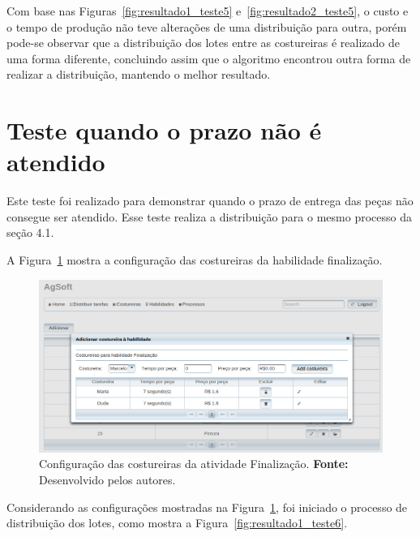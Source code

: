 \par Com base nas Figuras~\ref{fig:resultado1_teste5}
e~\ref{fig:resultado2_teste5}, o custo e o tempo de produção não teve alterações de uma distribuição para outra, porém 
pode-se observar que a distribuição dos lotes entre as costureiras é realizado de uma forma
diferente, concluindo assim que o algoritmo encontrou outra forma de realizar a
distribuição, mantendo o melhor resultado.

\section{Teste quando o prazo não é atendido}

\par Este teste foi realizado para demonstrar quando o prazo de entrega das
peças não consegue ser atendido. Esse teste realiza a distribuição para o mesmo
processo da seção 4.1.

\par A Figura~\ref{fig:configuracao_costureiras_teste6} mostra a configuração
das costureiras da habilidade finalização.

\begin{figure}[h!]
	\centerline{\includegraphics[width=13.5cm]{./imagens/configuracao_costureiras_teste6.png}}
	\caption[Configuração das costureiras da atividade Finalização.] 
	{Configuração das costureiras da atividade Finalização. \textbf{Fonte:} Desenvolvido pelos
	autores.}
	\label{fig:configuracao_costureiras_teste6}
\end{figure}

\par Considerando as configurações mostradas na
Figura~\ref{fig:configuracao_costureiras_teste6}, foi iniciado o processo de
distribuição dos lotes, como mostra a Figura~\ref{fig:resultado1_teste6}.



